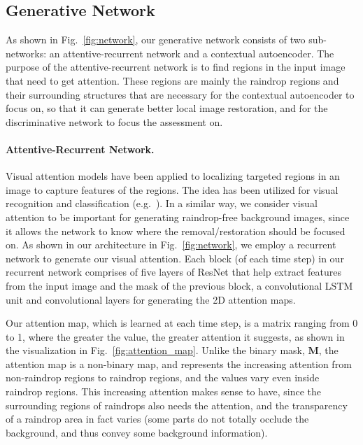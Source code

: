 \documentclass[10pt,twocolumn,letterpaper]{article}
\begin{document}
\subsection{Generative Network}

As shown in Fig.~\ref{fig:network}, our generative network consists of two sub-networks: an attentive-recurrent network and a contextual autoencoder. The purpose of the attentive-recurrent network is to find regions in the input image that need to get attention. These regions are mainly the raindrop regions and their surrounding structures that are necessary for the contextual autoencoder to focus on, so that it can generate better local image restoration, and  for the discriminative network to focus the assessment on.

\paragraph{Attentive-Recurrent Network.}
Visual attention models have been applied to localizing targeted regions in an image to capture features of the regions.  The idea has been utilized for visual recognition and classification (e.g.~\cite{zhao2016diversified,mnih2014recurrent,gregor2015draw}). In a similar way, we consider visual attention to be important for generating raindrop-free background images, since it allows the network to know where the removal/restoration should be focused on. As shown in our architecture in Fig.~\ref{fig:network}, we employ a recurrent network to generate our visual attention.
Each block (of each time step) in our recurrent network comprises of five layers of ResNet \cite{he2016deep} that help extract features from the input image and the mask of the previous block, a convolutional LSTM unit \cite{xingjian2015convolutional}  and convolutional layers for generating the 2D attention maps.

Our attention map, which is learned at each time step, is a matrix ranging from 0 to 1, where the greater the value, the greater attention it suggests, as shown in the visualization in Fig.~\ref{fig:attention_map}. Unlike the binary mask, $\mathbf{M}$, the attention map is a  non-binary map, and represents the increasing attention from non-raindrop regions to raindrop regions, and the values vary even inside raindrop regions. This increasing attention makes sense to have, since the surrounding regions of raindrops also needs the attention, and the transparency of a raindrop area in fact varies (some parts do not totally occlude the background, and thus convey some background information).
\end{document}
